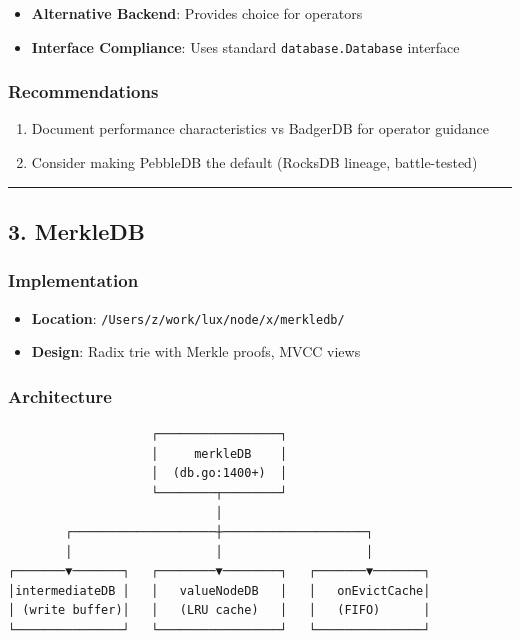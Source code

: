 \documentclass[
]{article}
\providecommand{\tightlist}{%
  \setlength{\itemsep}{0pt}\setlength{\parskip}{0pt}}
\begin{document}
\begin{itemize}
\tightlist
\item
  \textbf{Alternative Backend}: Provides choice for operators
\item
  \textbf{Interface Compliance}: Uses standard
  \texttt{database.Database} interface
\end{itemize}

\subsubsection{Recommendations}\label{recommendations-1}

\begin{enumerate}
\def\labelenumi{\arabic{enumi}.}
\tightlist
\item
  Document performance characteristics vs BadgerDB for operator guidance
\item
  Consider making PebbleDB the default (RocksDB lineage, battle-tested)
\end{enumerate}

\begin{center}\rule{0.5\linewidth}{0.5pt}\end{center}

\subsection{3. MerkleDB}\label{3-merkledb}

\subsubsection{Implementation}\label{implementation-2}

\begin{itemize}
\tightlist
\item
  \textbf{Location}: \texttt{/Users/z/work/lux/node/x/merkledb/}
\item
  \textbf{Design}: Radix trie with Merkle proofs, MVCC views
\end{itemize}

\subsubsection{Architecture}\label{architecture}

\begin{verbatim}
                    ┌─────────────────┐
                    │     merkleDB    │
                    │  (db.go:1400+)  │
                    └────────┬────────┘
                             │
        ┌────────────────────┼────────────────────┐
        │                    │                    │
┌───────▼───────┐   ┌────────▼────────┐   ┌───────▼───────┐
│intermediateDB │   │   valueNodeDB   │   │   onEvictCache│
│ (write buffer)│   │   (LRU cache)   │   │   (FIFO)      │
└───────────────┘   └─────────────────┘   └───────────────┘
\end{verbatim}
\end{document}
